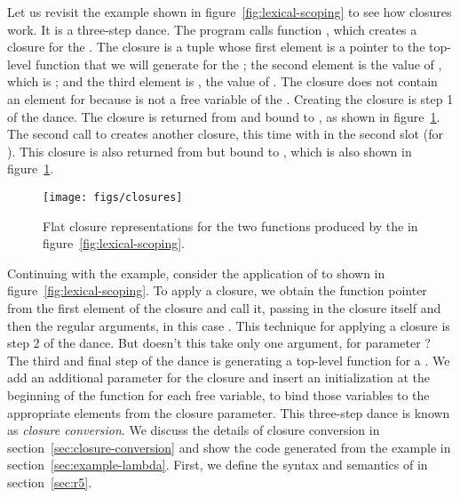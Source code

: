 \documentclass[7x10]{TimesAPriori_MIT}%
\numberwithin{theorem}{chapter}
\numberwithin{definition}{chapter}
\numberwithin{equation}{chapter}
\begin{document}
Let us revisit the example shown in figure~\ref{fig:lexical-scoping}
to see how closures work. It is a three-step dance. The program calls
function , which creates a closure for the . The
closure is a tuple whose first element is a pointer to the top-level
function that we will generate for the ; the second
element is the value of , which is ; and the third
element is , the value of . The closure does not
contain an element for  because  is not a free
variable of the . Creating the closure is step 1 of the
dance. The closure is returned from  and bound to , as
shown in figure~\ref{fig:closures}.
%
The second call to  creates another closure, this time with
 in the second slot (for ). This closure is also
returned from  but bound to , which is also shown in
figure~\ref{fig:closures}.

\begin{figure}[tbp]
  \centering
  \begin{minipage}{0.65\textwidth}
  \begin{tcolorbox}[colback=white]
    \texttt{[image: figs/closures]}
  \end{tcolorbox}
  \end{minipage}
\caption{Flat closure representations for the two functions
  produced by the  in figure~\ref{fig:lexical-scoping}.}
\label{fig:closures}
\end{figure}

Continuing with the example, consider the application of  to
 shown in figure~\ref{fig:lexical-scoping}.  To apply a
closure, we obtain the function pointer from the first element of the
closure and call it, passing in the closure itself and then the
regular arguments, in this case . This technique for applying
a closure is step 2 of the dance.
%
But doesn't this  take only one argument, for parameter
? The third and final step of the dance is generating a
top-level function for a .  We add an additional
parameter for the closure and insert an initialization at the beginning
of the function for each free variable, to bind those variables to the
appropriate elements from the closure parameter.
%
This three-step dance is known as \emph{closure
  conversion}. We discuss the
details of closure conversion in section~\ref{sec:closure-conversion}
and show the code generated from the example in
section~\ref{sec:example-lambda}. First, we define the syntax and
semantics of \LangLam{} in section~\ref{sec:r5}.
\end{document}
